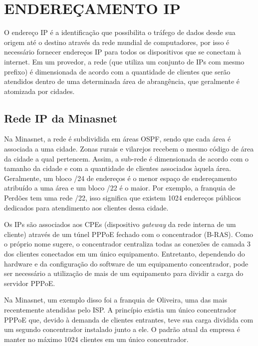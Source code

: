 \chapter{ENDEREÇAMENTO IP}
\label{cap:enderecamento}

    O endereço IP é a identificação que possibilita o tráfego de dados desde sua origem até o destino através da rede mundial de computadores, por isso é necessário fornecer endereços IP para todos os dispositivos que se conectam à internet. Em um provedor, a rede (que utiliza um conjunto de IPs com mesmo prefixo) é dimensionada de acordo com a quantidade de clientes que serão atendidos dentro de uma determinada área de abrangência, que geralmente é atomizada por cidades.

\section{Rede IP da Minasnet}
    
    Na Minasnet, a rede é subdividida em áreas OSPF, sendo que cada área é associada a uma cidade. Zonas rurais e vilarejos recebem o mesmo código de área da cidade a qual pertencem. Assim, a sub-rede é dimensionada de acordo com o tamanho da cidade e com a quantidade de clientes associados àquela área. Geralmente, um bloco /24 de endereços é o menor espaço de endereçamento atribuído a uma área e um bloco /22 é o maior. Por exemplo, a franquia de Perdões tem uma rede /22, isso significa que existem 1024 endereços públicos dedicados para atendimento aos clientes dessa cidade.
    
   Os IPs são associados aos CPEs (dispositivo \textit{gateway} da rede interna de um cliente) através de um túnel PPPoE fechado com o concentrador (B-RAS). Como o próprio nome sugere, o concentrador centraliza todas as conexões de camada 3 dos clientes conectados em um único equipamento. Entretanto, dependendo do hardware e da configuração do software de um equipamento concentrador, pode ser necessário a utilização de mais de um equipamento para dividir a carga do servidor PPPoE. 
   
   Na Minasnet, um exemplo disso foi a franquia de Oliveira, uma das mais recentemente atendidas pelo ISP. A princípio existia um único concentrador PPPoE que, devido à demanda de clientes entrantes, teve sua carga dividida com um segundo concentrador instalado junto a ele. O padrão atual da empresa é manter no máximo 1024 clientes em um único concentrador.
   
